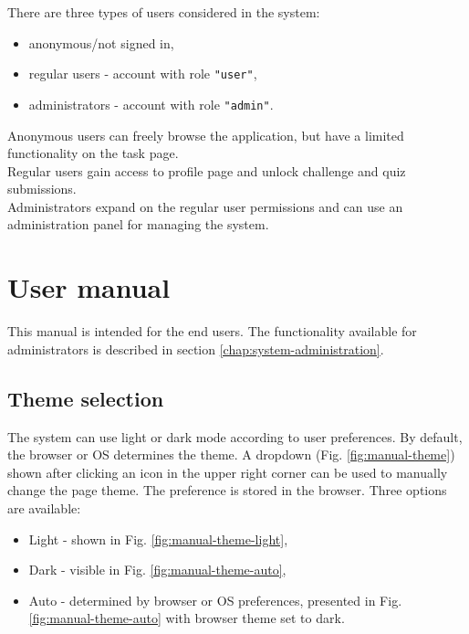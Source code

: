 There are three types of users considered in the system:
\begin{itemize}
    \item anonymous/not signed in,
    \item regular users - account with role \texttt{"user"},
    \item administrators - account with role \texttt{"admin"}.
\end{itemize}

Anonymous users can freely browse the application, but have a limited functionality on the task page.\\
Regular users gain access to profile page and unlock challenge and quiz submissions.\\
Administrators expand on the regular user permissions and can use an administration panel for managing the system.

\section{User manual}

This manual is intended for the end users. The functionality available for administrators is described in section \ref{chap:system-administration}.

\subsection{Theme selection}

The system can use light or dark mode according to user preferences. By default, the browser or OS determines the theme. A dropdown (Fig. \ref{fig:manual-theme}) shown after clicking an icon in the upper right corner can be used to manually change the page theme. The preference is stored in the browser. Three options are available:

\begin{itemize}
    \item Light - shown in Fig. \ref{fig:manual-theme-light},
    \item Dark - visible in Fig. \ref{fig:manual-theme-auto},
    \item Auto - determined by browser or OS preferences, presented in Fig. \ref{fig:manual-theme-auto} with browser theme set to dark.
\end{itemize}

